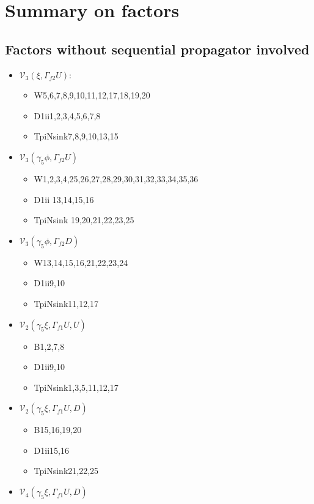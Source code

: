 \documentclass{article}[12pt]
\begin{document}
\section{Summary on factors}
\subsection{Factors without sequential propagator involved}
\begin{itemize}
\item ${\mathcal V}_3\left(\xi, \Gamma_{f2} U\right)$:
\begin{itemize}
\item W5,6,7,8,9,10,11,12,17,18,19,20
\item D1ii1,2,3,4,5,6,7,8
\item TpiNsink7,8,9,10,13,15
\end{itemize}
\item ${\mathcal V}_3\left(\gamma_5\phi, \Gamma_{f2} U\right)$
\begin{itemize}
\item W1,2,3,4,25,26,27,28,29,30,31,32,33,34,35,36
\item D1ii 13,14,15,16
\item TpiNsink 19,20,21,22,23,25
\end{itemize}
\item ${\mathcal V}_3\left(\gamma_5\phi, \Gamma_{f2} D\right)$
\begin{itemize}
\item W13,14,15,16,21,22,23,24
\item D1ii9,10
\item TpiNsink11,12,17
\end{itemize}
\item ${\mathcal V}_2\left(\gamma_5\xi, \Gamma_{f1} U, U\right)$
\begin{itemize}
\item B1,2,7,8
\item D1ii9,10
\item TpiNsink1,3,5,11,12,17
\end{itemize}
\item ${\mathcal V}_2\left(\gamma_5\xi, \Gamma_{f1} U, D\right)$
\begin{itemize}
\item B15,16,19,20
\item D1ii15,16
\item TpiNsink21,22,25
\end{itemize}
\item ${\mathcal V}_4\left(\gamma_5\xi, \Gamma_{f1} U, D\right)$

\end{itemize}
\end{document}
